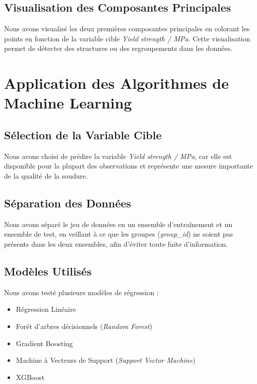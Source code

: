 \documentclass{article}
\begin{document}
\subsection{Visualisation des Composantes Principales}

Nous avons visualisé les deux premières composantes principales en colorant les points en fonction de la variable cible \textit{Yield strength / MPa}. Cette visualisation permet de détecter des structures ou des regroupements dans les données.

\section{Application des Algorithmes de Machine Learning}

\subsection{Sélection de la Variable Cible}

Nous avons choisi de prédire la variable \textit{Yield strength / MPa}, car elle est disponible pour la plupart des observations et représente une mesure importante de la qualité de la soudure.

\subsection{Séparation des Données}

Nous avons séparé le jeu de données en un ensemble d'entraînement et un ensemble de test, en veillant à ce que les groupes (\textit{group\_id}) ne soient pas présents dans les deux ensembles, afin d'éviter toute fuite d'information.

\subsection{Modèles Utilisés}

Nous avons testé plusieurs modèles de régression :

\begin{itemize}
    \item Régression Linéaire
    \item Forêt d'arbres décisionnels (\textit{Random Forest})
    \item Gradient Boosting
    \item Machine à Vecteurs de Support (\textit{Support Vector Machine})
    \item XGBoost
\end{itemize}
\end{document}
